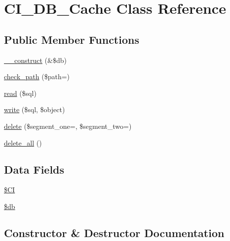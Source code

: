 \hypertarget{class_c_i___d_b___cache}{}\section{C\+I\+\_\+\+D\+B\+\_\+\+Cache Class Reference}
\label{class_c_i___d_b___cache}
\subsection*{Public Member Functions}
\begin{DoxyCompactItemize}
\item 
\mbox{\hyperlink{class_c_i___d_b___cache_aaf2ef772755ec6f361d44e16cc9ffd69}{\+\_\+\+\_\+construct}} (\&\$db)
\item 
\mbox{\hyperlink{class_c_i___d_b___cache_adb73b6f91025d00c565d228c4f611f41}{check\+\_\+path}} (\$path=\textquotesingle{}\textquotesingle{})
\item 
\mbox{\hyperlink{class_c_i___d_b___cache_a6e421e93555105d187d7e6ba4c84521b}{read}} (\$sql)
\item 
\mbox{\hyperlink{class_c_i___d_b___cache_a483ea50183465928c931aa17b4f4b5b8}{write}} (\$sql, \$object)
\item 
\mbox{\hyperlink{class_c_i___d_b___cache_ab97f36d9c24db4b2e91c9e02342cc994}{delete}} (\$segment\+\_\+one=\textquotesingle{}\textquotesingle{}, \$segment\+\_\+two=\textquotesingle{}\textquotesingle{})
\item 
\mbox{\hyperlink{class_c_i___d_b___cache_ac83c8ea1573fe325dfd87a282627fe6d}{delete\+\_\+all}} ()
\end{DoxyCompactItemize}
\subsection*{Data Fields}
\begin{DoxyCompactItemize}
\item 
\mbox{\hyperlink{class_c_i___d_b___cache_ae0314d046ddf7fcfaec03222977427d3}{\$\+CI}}
\item 
\mbox{\hyperlink{class_c_i___d_b___cache_a1fa3127fc82f96b1436d871ef02be319}{\$db}}
\end{DoxyCompactItemize}


\subsection{Constructor \& Destructor Documentation}
\mbox{\label{class_c_i___d_b___cache_aaf2ef772755ec6f361d44e16cc9ffd69}} 
